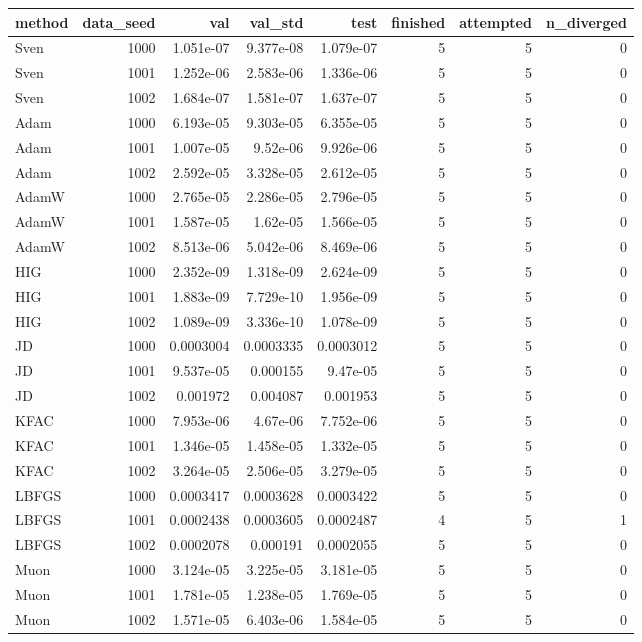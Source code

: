 \begin{tabular}{lrrrrrrr}
\toprule
method & data\_seed & val & val\_std & test & finished & attempted & n\_diverged \\
\midrule
Sven & 1000 & 1.051e-07 & 9.377e-08 & 1.079e-07 & 5 & 5 & 0 \\
Sven & 1001 & 1.252e-06 & 2.583e-06 & 1.336e-06 & 5 & 5 & 0 \\
Sven & 1002 & 1.684e-07 & 1.581e-07 & 1.637e-07 & 5 & 5 & 0 \\
Adam & 1000 & 6.193e-05 & 9.303e-05 & 6.355e-05 & 5 & 5 & 0 \\
Adam & 1001 & 1.007e-05 & 9.52e-06 & 9.926e-06 & 5 & 5 & 0 \\
Adam & 1002 & 2.592e-05 & 3.328e-05 & 2.612e-05 & 5 & 5 & 0 \\
AdamW & 1000 & 2.765e-05 & 2.286e-05 & 2.796e-05 & 5 & 5 & 0 \\
AdamW & 1001 & 1.587e-05 & 1.62e-05 & 1.566e-05 & 5 & 5 & 0 \\
AdamW & 1002 & 8.513e-06 & 5.042e-06 & 8.469e-06 & 5 & 5 & 0 \\
HIG & 1000 & 2.352e-09 & 1.318e-09 & 2.624e-09 & 5 & 5 & 0 \\
HIG & 1001 & 1.883e-09 & 7.729e-10 & 1.956e-09 & 5 & 5 & 0 \\
HIG & 1002 & 1.089e-09 & 3.336e-10 & 1.078e-09 & 5 & 5 & 0 \\
JD & 1000 & 0.0003004 & 0.0003335 & 0.0003012 & 5 & 5 & 0 \\
JD & 1001 & 9.537e-05 & 0.000155 & 9.47e-05 & 5 & 5 & 0 \\
JD & 1002 & 0.001972 & 0.004087 & 0.001953 & 5 & 5 & 0 \\
KFAC & 1000 & 7.953e-06 & 4.67e-06 & 7.752e-06 & 5 & 5 & 0 \\
KFAC & 1001 & 1.346e-05 & 1.458e-05 & 1.332e-05 & 5 & 5 & 0 \\
KFAC & 1002 & 3.264e-05 & 2.506e-05 & 3.279e-05 & 5 & 5 & 0 \\
LBFGS & 1000 & 0.0003417 & 0.0003628 & 0.0003422 & 5 & 5 & 0 \\
LBFGS & 1001 & 0.0002438 & 0.0003605 & 0.0002487 & 4 & 5 & 1 \\
LBFGS & 1002 & 0.0002078 & 0.000191 & 0.0002055 & 5 & 5 & 0 \\
Muon & 1000 & 3.124e-05 & 3.225e-05 & 3.181e-05 & 5 & 5 & 0 \\
Muon & 1001 & 1.781e-05 & 1.238e-05 & 1.769e-05 & 5 & 5 & 0 \\
Muon & 1002 & 1.571e-05 & 6.403e-06 & 1.584e-05 & 5 & 5 & 0 \\

\end{tabular}
